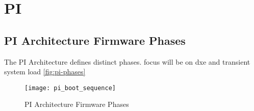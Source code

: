 
\section{\acf{PI}}

\subsection{\acs{PI} Architecture Firmware Phases}

The \ac{PI} Architecture defines distinct phases.
focus will be on dxe and transient system load
\autoref{fig:pi-phases}



\begin{figure}[htb]%
    \centering%
    \texttt{[image: pi\_boot\_sequence]}%
    \caption{\ac{PI} Architecture Firmware Phases \cite[Figure 2-1]{pi-spec}}%
    \label{fig:pi-phases}%
\end{figure}


